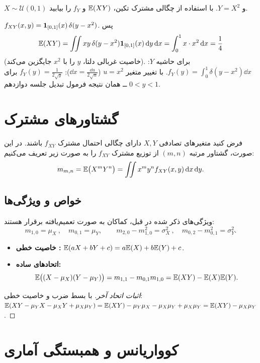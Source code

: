 \begin{example}
$X\sim\mathcal U(0,1)$ و $Y=X^2$. با استفاده از چگالی مشترک تکین، $\mathbb{E}(XY)$ و $f_Y$ را بیابید.
\begin{solution}
$f_{XY}(x,y)=\mathbf{1}_{[0,1]}(x)\,\delta(y-x^2)$. پس
\[
\mathbb{E}(XY)=\iint xy\,\delta(y-x^2)\mathbf{1}_{[0,1]}(x)\,\mathrm{d} y\,\mathrm{d} x=\int_0^1x\cdot x^2\,\mathrm{d} x=\frac14
\]
(خاصیت غربالی دلتا، $y$ را با $x^2$ جایگزین می‌کند). برای حاشیه $Y$: $f_Y(y)=\int_0^1\delta(y-x^2)\dd x$. با تغییر متغیر $u=x^2$ ($\dd x=\frac{\dd u}{2\sqrt u}$): $f_Y(y)=\frac{1}{2\sqrt y}$ برای $0<y<1$ ــ همان نتیجه فرمول تبدیل جلسه دوازدهم.
\end{solution}
\end{example}

\section{گشتاورهای مشترک }

\begin{definition}
فرض کنید متغیرهای تصادفی $X,Y$ دارای چگالی احتمال مشترک $f_{XY}$ باشند. در این صورت، گشتاور مرتبه $(m,n)$ از توزیع مشترک $f_{XY}$ را به صورت زیر تعریف می‌کنیم:
\[
m_{m,n}=\mathbb{E}\big(X^mY^n\big)=\iint x^my^nf_{XY}(x,y)\,\mathrm{d} x\,\mathrm{d} y .
\]
\end{definition}

\subsection{خواص و ویژگی‌ها}
ویژگی‌های ذکر شده در قبل، کماکان به صورت تعمیم‌یافته برقرار هستند:
\[
m_{1,0}=\mu_X\ ,\quad m_{0,1}=\mu_Y,
\qquad
m_{2,0}-m_{1,0}^2=\sigma_X^2\ ,\quad m_{0,2}-m_{0,1}^2=\sigma_Y^2 .
\]
\begin{itemize}
\item \textbf{خاصیت خطی :}
$\mathbb{E}(aX+bY+c)=a\mathbb{E}(X)+b\mathbb{E}(Y)+c$.
\item \textbf{اتحادهای ساده:}
\[
\mathbb{E}\big((X-\mu_X)(Y-\mu_Y)\big)=m_{1,1}-m_{0,1}m_{1,0}=\mathbb{E}(XY)-\mathbb{E}(X)\mathbb{E}(Y).
\]
\end{itemize}
\begin{proof}[اثبات اتحاد آخر]
با بسط ضرب و خاصیت خطی:
$\mathbb{E}(XY-\mu_YX-\mu_XY+\mu_X\mu_Y)=\mathbb{E}(XY)-\mu_Y\mu_X-\mu_X\mu_Y+\mu_X\mu_Y=\mathbb{E}(XY)-\mu_X\mu_Y$.
\end{proof}

\section{کوواریانس و همبستگی آماری}

